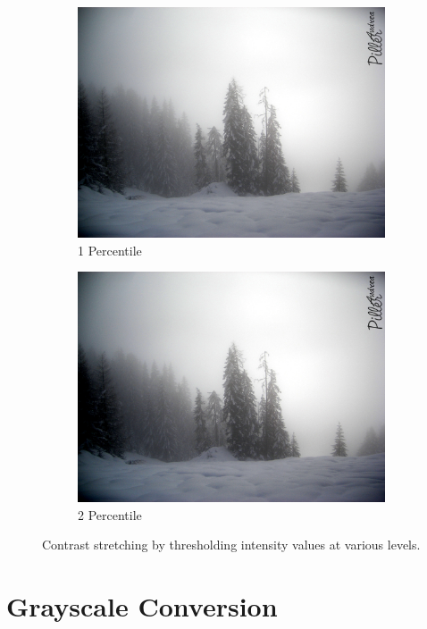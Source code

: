 \documentclass[a4paper]{article}
\begin{document}
\begin{figure}[H]
\begin{subfigure}[b]{.225\textwidth}
        \includegraphics[width=\textwidth]{output/fog_contrast_1.jpg}
        \caption{1 Percentile}
    \end{subfigure}
    \hfill
    \begin{subfigure}[b]{.225\textwidth}
        \centering
        \includegraphics[width=\textwidth]{output/fog_contrast_2.jpg}
        \caption{2 Percentile}
    \end{subfigure}
    \hfill
    \caption{Contrast stretching by thresholding intensity values at various levels.}
    \label{fig:contrast}
\end{figure}

\section{Grayscale Conversion}
\end{document}

